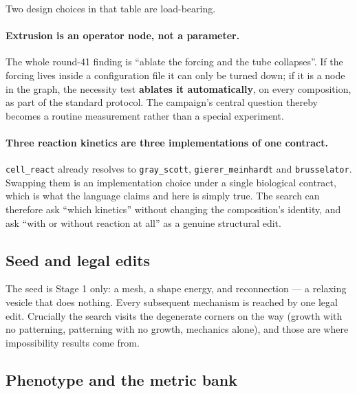 \documentclass[11pt]{article}
\newcommand{\code}[1]{\texttt{#1}}
\newcommand{\op}[1]{\textcolor{cop}{\texttt{#1}}}
\begin{document}
Two design choices in that table are load-bearing.

\paragraph{Extrusion is an operator node, not a parameter.}
The whole round-41 finding is ``ablate the forcing and the tube collapses''. If the forcing lives
inside a configuration file it can only be turned down; if it is a node in the graph, the
necessity test \textbf{ablates it automatically}, on every composition, as part of the standard
protocol. The campaign's central question thereby becomes a routine measurement rather than a
special experiment.

\paragraph{Three reaction kinetics are three implementations of one contract.}
\op{cell\_react} already resolves to \code{gray\_scott}, \code{gierer\_meinhardt} and
\code{brusselator}. Swapping them is an implementation choice under a single biological contract,
which is what the language claims and here is simply true. The search can therefore ask ``which
kinetics'' without changing the composition's identity, and ask ``with or without reaction at
all'' as a genuine structural edit.

\subsection{Seed and legal edits}

The seed is Stage 1 only: a mesh, a shape energy, and reconnection --- a relaxing vesicle that
does nothing. Every subsequent mechanism is reached by one legal edit. Crucially the search
visits the degenerate corners on the way (growth with no patterning, patterning with no growth,
mechanics alone), and those are where impossibility results come from.

\subsection{Phenotype and the metric bank}
\end{document}
